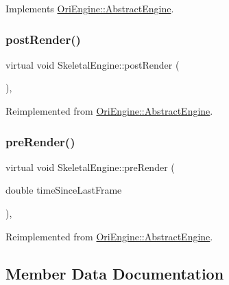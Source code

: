 Implements \hyperlink{class_ori_engine_1_1_abstract_engine_a7359c90344c928e283d177159780646e}{Ori\+Engine\+::\+Abstract\+Engine}.

\hypertarget{class_skeletal_engine_a58981a23dad5e0bf14aadede98bba12f}{}\label{class_skeletal_engine_a58981a23dad5e0bf14aadede98bba12f} 
\subsubsection{\texorpdfstring{post\+Render()}{postRender()}}
{\footnotesize\ttfamily virtual void Skeletal\+Engine\+::post\+Render (\begin{DoxyParamCaption}{ }\end{DoxyParamCaption})\hspace{0.3cm}{\ttfamily [inline]}, {\ttfamily [virtual]}}



Reimplemented from \hyperlink{class_ori_engine_1_1_abstract_engine_a12ce6df5383341e36fd674a5e026bf3f}{Ori\+Engine\+::\+Abstract\+Engine}.

\hypertarget{class_skeletal_engine_a9d3352322b1c4c8aa6332765e8efcde6}{}\label{class_skeletal_engine_a9d3352322b1c4c8aa6332765e8efcde6} 
\subsubsection{\texorpdfstring{pre\+Render()}{preRender()}}
{\footnotesize\ttfamily virtual void Skeletal\+Engine\+::pre\+Render (\begin{DoxyParamCaption}\item[{double}]{time\+Since\+Last\+Frame }\end{DoxyParamCaption})\hspace{0.3cm}{\ttfamily [inline]}, {\ttfamily [virtual]}}



Reimplemented from \hyperlink{class_ori_engine_1_1_abstract_engine_a132e10c2452afe2d555ac85ea1b48845}{Ori\+Engine\+::\+Abstract\+Engine}.



\subsection{Member Data Documentation}
\hypertarget{class_skeletal_engine_a88bfb5568460595bea7d703c14e0fd97}{}\label{class_skeletal_engine_a88bfb5568460595bea7d703c14e0fd97} 
